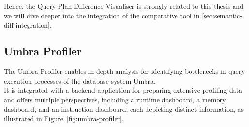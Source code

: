 Hence, the Query Plan Difference Visualiser is strongly related to this thesis and we will dive deeper into the integration of the comparative tool in \ref{sec:semantic-diff-integration}.



\subsection{Umbra Profiler}
The Umbra Profiler enables in-depth analysis for identifying bottlenecks in query execution processes of the database system Umbra.
\\ It is integrated with a backend application for preparing extensive profiling data and offers multiple perspectives, including a runtime dashboard, a memory dashboard, and an instruction dashboard, each depicting distinct information, as illustrated in Figure~\ref{fig:umbra-profiler}.

